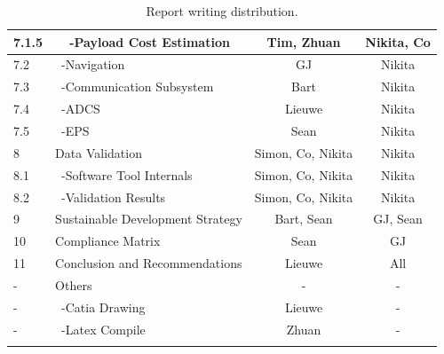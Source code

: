 \begin{center}
\begin{longtable}{|l|l|c|c|}
 7.1.5   & \ \ -Payload Cost Estimation        & Tim, Zhuan & Nikita, Co\\\hline
 7.2   & \ -Navigation                        & GJ & Nikita\\\hline
 7.3     & \ -Communication Subsystem           & Bart & Nikita\\\hline
 7.4     & \ -ADCS                              & Lieuwe & Nikita\\\hline
 7.5     & \ -EPS                               & Sean & Nikita\\\hline\hline
 8       & Data Validation                      & Simon, Co, Nikita & Nikita \\\hline
 8.1     & \ -Software Tool Internals           & Simon, Co, Nikita & Nikita \\\hline
 8.2     & \ -Validation Results                & Simon, Co, Nikita & Nikita \\\hline\hline
 9       & Sustainable Development Strategy     &Bart, Sean & GJ, Sean \\\hline\hline
 10      & Compliance Matrix                    & Sean & GJ \\\hline\hline
 11      & Conclusion and Recommendations       & Lieuwe & All\\\hline\hline
 -       & Others                               & - & - \\\hline
 -       & \ -Catia Drawing                     & Lieuwe & -\\\hline
 -       & \ -Latex Compile                     & Zhuan & -\\\hline

\caption{Report writing distribution.}
\label{tab:RWD}
\end{longtable}
\end{center}